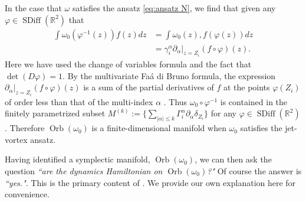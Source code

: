 \documentclass[12pt]{amsart}
\newcommand{\R}{\ensuremath{\mathbb{R}}}
\theoremstyle{remark}
\DeclareMathOperator{\SDiff}{SDiff}
\DeclareMathOperator{\Orb}{Orb}
\begin{document}
In the case that $\omega$ satisfies the ansatz \eqref{eq:ansatz N}, we find that given any $\varphi \in \SDiff(\R^2)$
	that
	\begin{align*}
		\int \omega_0(\varphi^{-1}(z)) f(z) dz &= \int \omega_0(z) , f (\varphi(z)) dz \\
                &= \gamma_i^\alpha \partial_{\alpha}|_{z=Z_i} (f \circ\varphi)(z).
	\end{align*}
	Here we have used the change of variables formula and the fact that $\det( D\varphi) = 1$.
	By the multivariate Fa\'a di Bruno formula, the expression $\partial_{\alpha}|_{z=Z_i} (f \circ\varphi)(z)$
	is a sum of the partial derivatives of $f$ at the points $\varphi(Z_i)$
	of order less than that of the multi-index $\alpha$ \cite{ConstantineSavits1996}.
        Thus $ \omega_0 \circ \varphi^{-1}$ is contained in the finitely parametrized subset $M^{(k)} := \{ \sum_{|\alpha| \leq k} \Gamma_i^\alpha \partial_{\alpha} \delta_{Z_i} \}$
        for any $\varphi \in \SDiff( \R^2)$.
        Therefore $\Orb(\omega_0)$ is a finite-dimensional manifold when $\omega_0$ satisfies the jet-vortex ansatz.

Having identified a symplectic manifold, $\Orb(\omega_0)$, we can then ask the question \emph{``are the dynamics Hamiltonian on $\Orb(\omega_0)$?"}
Of course the answer is \emph{``yes."}.  This is the primary content of \cite{MarsdenWeinstein1983}.
We provide our own explanation here for convenience.
\end{document}
